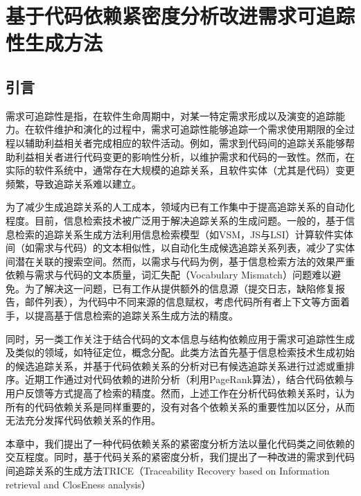 \chapter{基于代码依赖紧密度分析改进需求可追踪性生成方法}

\section{引言}

需求可追踪性是指，在软件生命周期中，对某一特定需求形成以及演变的追踪能力\cite{gotel1994analysis}。在软件维护和演化的过程中，需求可追踪性能够追踪一个需求使用期限的全过程以辅助利益相关者完成相应的软件活动\cite{mader2012assessing}。例如，需求到代码间的追踪关系能够帮助利益相关者进行代码变更的影响性分析，以维护需求和代码的一致性。然而，在实际的软件系统中，通常存在大规模的追踪关系，且软件实体（尤其是代码）变更频繁，导致追踪关系难以建立\cite{burgstaller2010understanding}。

为了减少生成追踪关系的人工成本，领域内已有工作集中于提高追踪关系的自动化程度。目前，信息检索技术被广泛用于解决追踪关系的生成问题\cite{antoniol2002recovering,cleland2005utilizing,marcus2003recovering}。一般的，基于信息检索的追踪关系生成方法利用信息检索模型（如VSM，JS与LSI）计算软件实体间（如需求与代码）的文本相似性，以自动化生成候选追踪关系列表，减少了实体间潜在关联的搜索空间。然而，以需求与代码为例，基于信息检索方法的效果严重依赖与需求与代码的文本质量，词汇失配（Vocabulary Mismatch）问题难以避免。为了解决这一问题，已有工作从提供额外的信息源（提交日志，缺陷修复报告，邮件列表）\cite{ali2013trustrace}，为代码中不同来源的信息赋权\cite{ali2012empirical}，考虑代码所有者上下文\cite{diaz2013using}等方面着手，以提高基于信息检索的追踪关系生成方法的精度。

同时，另一类工作关注于结合代码的文本信息与结构依赖应用于需求可追踪性生成及类似的领域，如特征定位\cite{zhao2006sniafl}，概念分配\cite{scanniello2015link}。此类方法首先基于信息检索技术生成初始的候选追踪关系，并基于代码依赖关系的分析对已有候选追踪关系进行过滤或重排序。近期工作通过对代码依赖的进阶分析（利用PageRank算法\cite{scanniello2015link}），结合代码依赖与用户反馈\cite{panichella2013and}等方式提高了检索的精度。然而，上述工作在分析代码依赖关系时，认为所有的代码依赖关系是同样重要的，没有对各个依赖关系的重要性加以区分，从而无法充分发挥代码依赖关系的作用。

本章中，我们提出了一种代码依赖关系的紧密度分析方法以量化代码类之间依赖的交互程度。同时，基于代码关系的紧密度分析，我们提出了一种改进的需求到代码间追踪关系的生成方法TRICE（Traceability Recovery based on Information retrieval and ClosEness analysis）

